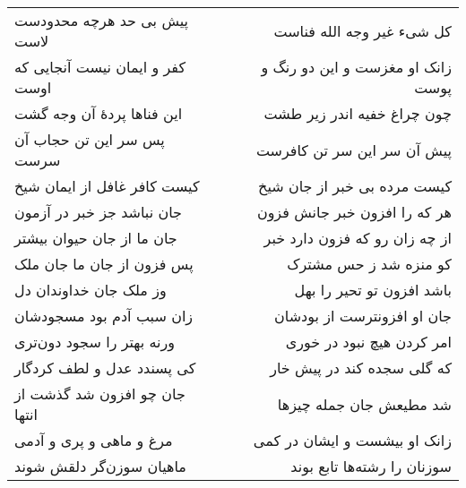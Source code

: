 \begin{center}
\begin{longtable}{l p{0.5cm} r}
پیش بی حد هرچه محدودست لاست
&&
کل شیء غیر وجه الله فناست
\\
کفر و ایمان نیست آنجایی که اوست
&&
زانک او مغزست و این دو رنگ و پوست
\\
این فناها پردهٔ آن وجه گشت
&&
چون چراغ خفیه اندر زیر طشت
\\
پس سر این تن حجاب آن سرست
&&
پیش آن سر این سر تن کافرست
\\
کیست کافر غافل از ایمان شیخ
&&
کیست مرده بی خبر از جان شیخ
\\
جان نباشد جز خبر در آزمون
&&
هر که را افزون خبر جانش فزون
\\
جان ما از جان حیوان بیشتر
&&
از چه زان رو که فزون دارد خبر
\\
پس فزون از جان ما جان ملک
&&
کو منزه شد ز حس مشترک
\\
وز ملک جان خداوندان دل
&&
باشد افزون تو تحیر را بهل
\\
زان سبب آدم بود مسجودشان
&&
جان او افزونترست از بودشان
\\
ورنه بهتر را سجود دون‌تری
&&
امر کردن هیچ نبود در خوری
\\
کی پسندد عدل و لطف کردگار
&&
که گلی سجده کند در پیش خار
\\
جان چو افزون شد گذشت از انتها
&&
شد مطیعش جان جمله چیزها
\\
مرغ و ماهی و پری و آدمی
&&
زانک او بیشست و ایشان در کمی
\\
ماهیان سوزن‌گر دلقش شوند
&&
سوزنان را رشته‌ها تابع بوند
\\
\end{longtable}
\end{center}

